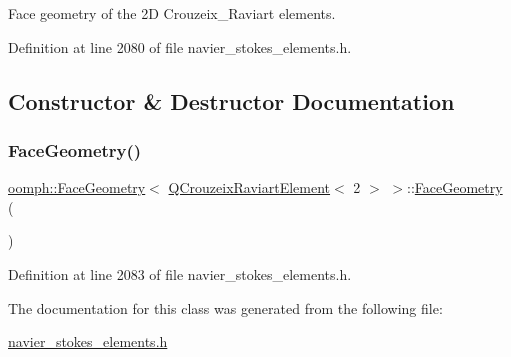 Face geometry of the 2D Crouzeix\+\_\+\+Raviart elements. 

Definition at line 2080 of file navier\+\_\+stokes\+\_\+elements.\+h.



\subsection{Constructor \& Destructor Documentation}
\mbox{\label{classoomph_1_1FaceGeometry_3_01QCrouzeixRaviartElement_3_012_01_4_01_4_ad1273faf77f63f9b5e987ccb7620b0d1}} 
\subsubsection{\texorpdfstring{Face\+Geometry()}{FaceGeometry()}}
{\footnotesize\ttfamily \hyperlink{classoomph_1_1FaceGeometry}{oomph\+::\+Face\+Geometry}$<$ \hyperlink{classoomph_1_1QCrouzeixRaviartElement}{Q\+Crouzeix\+Raviart\+Element}$<$ 2 $>$ $>$\+::\hyperlink{classoomph_1_1FaceGeometry}{Face\+Geometry} (\begin{DoxyParamCaption}{ }\end{DoxyParamCaption})\hspace{0.3cm}{\ttfamily [inline]}}



Definition at line 2083 of file navier\+\_\+stokes\+\_\+elements.\+h.



The documentation for this class was generated from the following file\+:\begin{DoxyCompactItemize}
\item 
\hyperlink{navier__stokes__elements_8h}{navier\+\_\+stokes\+\_\+elements.\+h}\end{DoxyCompactItemize}
